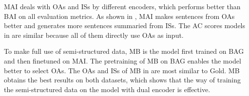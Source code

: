 MAI deals with OAs and ISs by different encoders, which performs better than BAI on all evaluation metrics. 
As shown in , MAI makes sentences from OAs better and generates more sentences summaried from ISs.
The AC scores models in  are similar
because all of them directly use OAs as input.

To make full use of semi-structured data,
MB is the model first trained on BAG and then finetuned on MAI.
The pretraining of MB on BAG enables the model better to select OAs. 
The OAs and ISs of MB in  are most similar to Gold.
MB obtains the best results on both datasets, which shows
that the way of training the semi-structured data on 
the model with dual encoder is effective. %

